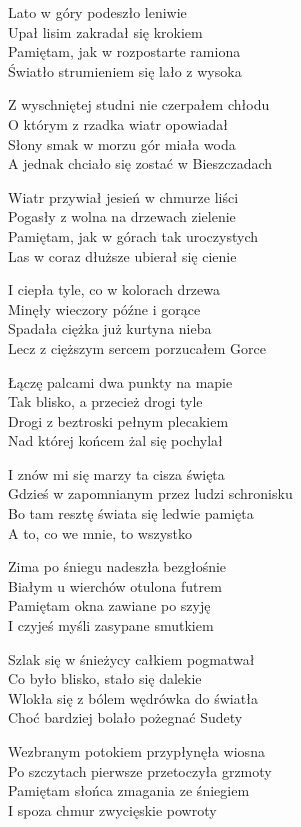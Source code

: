 \begin{text}
Lato w góry podeszło leniwie\\
Upał lisim zakradał się krokiem\\
Pamiętam, jak w rozpostarte ramiona\\
Światło strumieniem się lało z wysoka

Z wyschniętej studni nie czerpałem chłodu\\
O którym z rzadka wiatr opowiadał\\
Słony smak w morzu gór miała woda\\
A jednak chciało się zostać w Bieszczadach

Wiatr przywiał jesień w chmurze liści\\
Pogasły z wolna na drzewach zielenie\\
Pamiętam, jak w górach tak uroczystych\\
Las w coraz dłuższe ubierał się cienie

I ciepła tyle, co w kolorach drzewa\\
Minęły wieczory późne i gorące\\
Spadała ciężka już kurtyna nieba\\
Lecz z cięższym sercem porzucałem Gorce

Łączę palcami dwa punkty na mapie\\
Tak blisko, a przecież drogi tyle\\
Drogi z beztroski pełnym plecakiem\\
Nad której końcem żal się pochylał

I znów mi się marzy ta cisza święta\\
Gdzieś w zapomnianym przez ludzi schronisku\\
Bo tam resztę świata się ledwie pamięta\\
A to, co we mnie, to wszystko

Zima po śniegu nadeszła bezgłośnie\\
Białym u wierchów otulona futrem\\
Pamiętam okna zawiane po szyję\\
I czyjeś myśli zasypane smutkiem

Szlak się w śnieżycy całkiem pogmatwał\\
Co było blisko, stało się dalekie\\
Wlokła się z bólem wędrówka do światła\\
Choć bardziej bolało pożegnać Sudety

Wezbranym potokiem przypłynęła wiosna\\
Po szczytach pierwsze przetoczyła grzmoty\\
Pamiętam słońca zmagania ze śniegiem\\
I spoza chmur zwycięskie powroty


\end{text}
